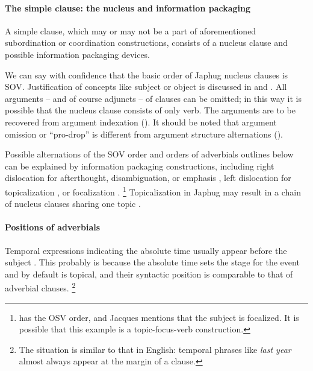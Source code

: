 \documentclass[a4paper, oneside, 12pt]{report}
\newcommand*{\citesec}[1]{\S~{#1}}
\newcommand*{\citepage}[1]{p.~{#1}}
\newcommand{\form}[1]{\emph{#1}}
\begin{document}
\paragraph*{The simple clause: the nucleus and information packaging}
\label{sec:grammatical.clause.template.nucleus-identification}
A simple clause, which may or may not be a part 
of aforementioned subordination or coordination constructions,
consists of a nucleus clause and possible information packaging devices.

We can say with confidence that the basic order of Japhug nucleus clauses is SOV.
Justification of concepts like subject or object is discussed in 
 and .
All arguments -- and of course adjuncts -- of clauses can be omitted;
in this way it is possible that the nucleus clause consists of only verb.
The arguments are to be recovered from argument indexation
().
It should be noted that argument omission or ``pro-drop''
is different from argument structure alternations
().

Possible alternations of the SOV order and orders of adverbials outlines below 
can be explained by information packaging constructions,
including right dislocation for afterthought, disambiguation, or emphasis 
\citep[\citesec{22.1.3}]{jacques2021grammar},
left dislocation for topicalization 
\citep[\citepage{1189}]{jacques2021grammar},
or focalization \citep[\citepage{1190}]{jacques2021grammar}.%
\footnote{
    \citep[\citepage{1190}]{jacques2021grammar} has the OSV order,
    and Jacques mentions that the subject is focalized.
    It is possible that this example is a topic-focus-verb construction.
}
Topicalization in Japhug may result in a chain of nucleus clauses sharing one topic
\citep[\citepage{1190}, (11)]{jacques2021grammar}.

\paragraph*{Positions of adverbials}\label{sec:grammatical.clause.template.adverb}
Temporal expressions indicating the absolute time usually appear before the subject
\citep[\citepage{344}, (167); \citepage{283}, (123)]{jacques2021grammar}.
This probably is because the absolute time sets the stage for the event
and by default is topical,
and their syntactic position is comparable to that of adverbial clauses.%
\footnote{
    The situation is similar to that in English:
    temporal phrases like \form{last year} almost always appear at the margin of a clause.
}
\end{document}
